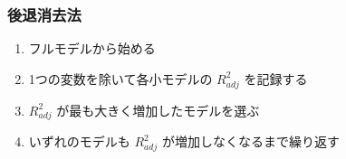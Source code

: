 
\begin{frame}
\frametitle{後退消去法}

\begin{enumerate}

\item フルモデルから始める
\item 1つの変数を除いて各小モデルの $R^2_{adj}$ を記録する
\item $R^2_{adj}$ が最も大きく増加したモデルを選ぶ
\item いずれのモデルも $R^2_{adj}$ が増加しなくなるまで繰り返す

\end{enumerate}

\end{frame}


